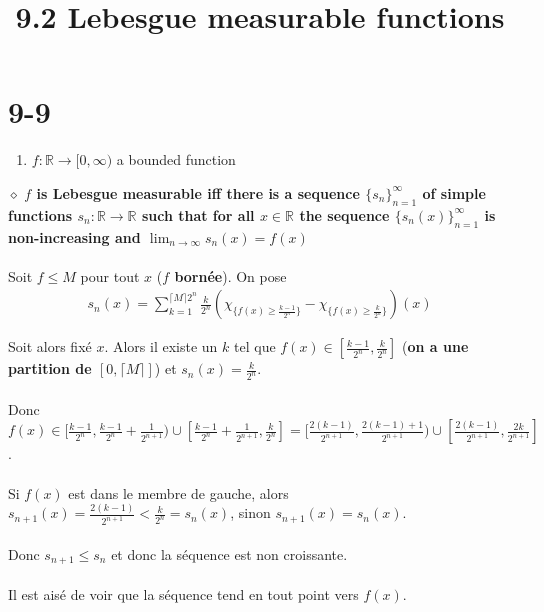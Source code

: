 \documentclass[a4paper,10pt]{article}
\title{9.2 Lebesgue measurable functions}
\begin{document}
\maketitle

\section*{9-9}
\begin{enumerate}
 \item $f : \mathbb{R} \rightarrow [0, \infty)$ a bounded function
\end{enumerate}
$\diamond$ \textbf{$f$ is Lebesgue measurable iff there is a sequence $\{s_n\}_{n=1}^\infty$ of simple functions $s_n : \mathbb{R} \rightarrow \mathbb{R}$ such that for all $x \in \mathbb{R}$ the sequence $\{s_n(x)\}_{n=1}^\infty$ is non-increasing and $\lim_{n \to \infty}s_n(x) = f(x)$}  
\\
\\
Soit $f \leq M$ pour tout $x$ (\textbf{$f$ bornée}). On pose 
\begin{align*}
	s_n (x) = \sum_{k=1}^{\lceil M \rceil 2^n} \frac{k}{2^n} (\chi_{\{f(x) \geq \frac{k-1}{2^n}\}} - \chi_{\{f(x) \geq \frac{k}{2^n} \}}) (x)
\end{align*}

Soit alors fixé $x$. Alors il existe un $k$ tel que $f(x) \in [\frac{k-1}{2^n}, \frac{k}{2^n}]$ (\textbf{on a une partition de $[0, \lceil M \rceil]$}) et $s_n(x) = \frac{k}{2^n}$.
\\
\\
Donc $f(x) \in [\frac{k-1}{2^n}, \frac{k-1}{2^n} + \frac{1}{2^{n+1}}) \cup [\frac{k-1}{2^n} + \frac{1}{2^{n+1}}, \frac{k}{2^n}] = [\frac{2(k-1)}{2^{n+1}}, \frac{2(k-1) + 1}{2^{n+1}}) \cup [\frac{2(k-1)}{2^{n+1}}, \frac{2k}{2^{n+1}}]$.
\\
\\
Si $f(x)$ est dans le membre de gauche, alors $s_{n+1}(x) = \frac{2(k-1)}{2^{n+1}} < \frac{k}{2^n} = s_n(x)$, sinon $s_{n+1}(x) = s_n(x)$. 
\\
\\
Donc $s_{n+1} \leq s_n$ et donc la séquence est non croissante.
\\
\\
Il est aisé de voir que la séquence tend en tout point vers $f(x)$. 
\end{document}
